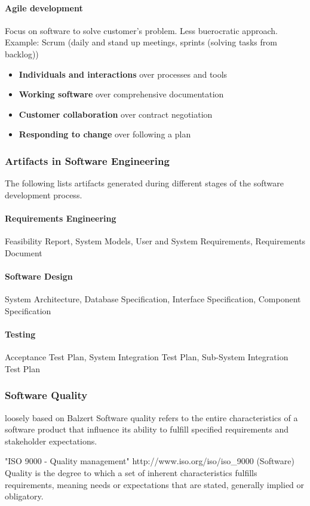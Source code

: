 
\paragraph{Agile development}
Focus on software to solve customer's problem. Less buerocratic approach. Example: Scrum (daily and stand up meetings, sprints (solving tasks from backlog))
\begin{itemize}
    \item \textbf{Individuals and interactions} over processes and tools
    \item \textbf{Working software} over comprehensive documentation
    \item \textbf{Customer collaboration} over contract negotiation
    \item \textbf{Responding to change} over following a plan
\end{itemize}

\subsubsection{Artifacts in Software Engineering}
The following lists artifacts generated during different stages of the software development process.
\paragraph{Requirements Engineering} Feasibility Report, System Models, User and System Requirements, Requirements Document
\paragraph{Software Design} System Architecture, Database Specification, Interface Specification, Component Specification
\paragraph{Testing} Acceptance Test Plan, System Integration Test Plan, Sub-System Integration Test Plan

\subsubsection{Software Quality}
\begin{chapquote}{loosely based on Balzert}
    Software quality refers to the entire characteristics of a software product that
    influence its ability to fulfill specified requirements and stakeholder expectations.
\end{chapquote}
\begin{chapquote}{"ISO 9000 - Quality management" http://www.iso.org/iso/iso\_9000}
    (Software) Quality is the degree to which a set of inherent characteristics fulfills requirements, meaning needs or expectations that are stated, generally implied or obligatory.
\end{chapquote}

